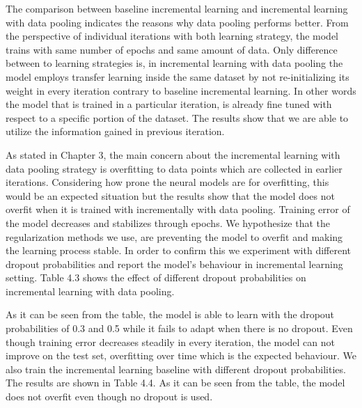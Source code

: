 The comparison between baseline incremental learning and incremental learning with data pooling indicates the reasons why data pooling performs better. From the perspective of individual iterations with both learning strategy, the model trains with same number of epochs and same amount of data. Only difference between to learning strategies is, in incremental learning with data pooling the model employs transfer learning inside the same dataset by not re-initializing its weight in every iteration contrary to baseline incremental learning. In other words the model that is trained in a particular iteration, is already fine tuned with respect to a specific portion of the dataset. The results show that we are able to utilize the information gained in previous iteration.

As stated in Chapter 3, the main concern about the incremental learning with data pooling strategy is overfitting to data points which are collected in earlier iterations. Considering how prone the neural models are for overfitting, this would be an expected situation but the results show that the model does not overfit when it is trained with incrementally with data pooling. Training error of the model decreases and stabilizes through epochs. We hypothesize that the regularization methods we use, are preventing the model to overfit and making the learning process stable. In order to confirm this we experiment with different dropout probabilities and report the model's behaviour in incremental learning setting. Table 4.3 shows the effect of different dropout probabilities on incremental learning with data pooling.

As it can be seen from the table, the model is able to learn with the dropout probabilities of 0.3 and 0.5 while it fails to adapt when there is no dropout. Even though training error decreases steadily in every iteration, the model can not improve on the test set, overfitting over time which is the expected behaviour. We also train the incremental learning baseline with different dropout probabilities. The results are shown in Table 4.4. As it can be seen from the table, the model does not overfit even though no dropout is used.

